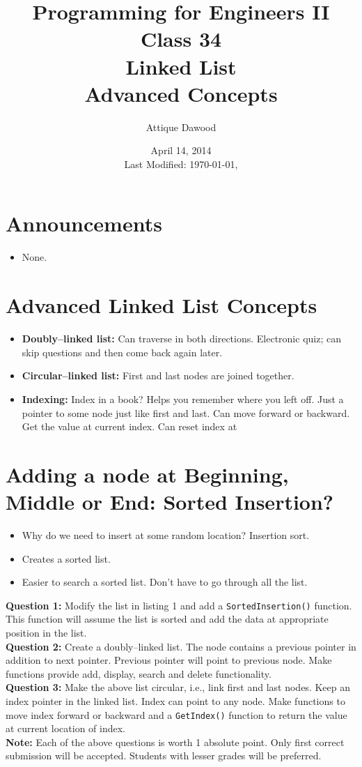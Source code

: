 \documentclass[12pt,a4paper]{article}
\title{\vspace{-2cm}Programming for Engineers II\\Class 34\\Linked List\\ Advanced Concepts}
\author{Attique Dawood}
\date{April 14, 2014\\[0.2cm] Last Modified: \today, \currenttime}
\begin{document}
\maketitle
\section{Announcements}
\begin{itemize}
\item None.
\end{itemize}
\section{Advanced Linked List Concepts}
\begin{itemize}
\item \textbf{Doubly--linked list:} Can traverse in both directions. Electronic quiz; can skip questions and then come back again later.
\item \textbf{Circular--linked list:} First and last nodes are joined together.
\item \textbf{Indexing:} Index in a book? Helps you remember where you left off. Just a pointer to some node just like first and last. Can move forward or backward. Get the value at current index. Can reset index at 
\end{itemize}
\section{Adding a node at Beginning, Middle or End: Sorted Insertion?}
\begin{itemize}
\item Why do we need to insert at some random location? Insertion sort.
\item Creates a sorted list.
\item Easier to search a sorted list. Don't have to go through all the list.
\end{itemize}
\textbf{Question 1:} Modify the list in listing 1 and add a \verb|SortedInsertion()| function. This function will assume the list is sorted and add the data at appropriate position in the list.\\
\textbf{Question 2:} Create a doubly--linked list. The node contains a previous pointer in addition to next pointer. Previous pointer will point to previous node. Make functions provide add, display, search and delete functionality.\\
\textbf{Question 3:} Make the above list circular, i.e., link first and last nodes. Keep an index pointer in the linked list. Index can point to any node. Make functions to move index forward or backward and a \verb|GetIndex()| function to return the value at current location of index.\\
\textbf{Note:} Each of the above questions is worth 1 absolute point. Only first correct submission will be accepted. Students with lesser grades will be preferred.
%
%
\end{document}
